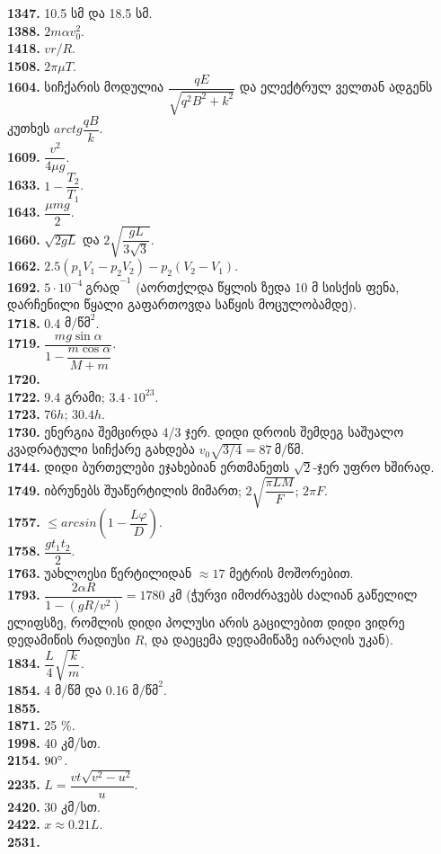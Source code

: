 \documentclass[12pt,a4paper,]{report}
\begin{document}
\textbf{1347.} 10.5 სმ და 18.5 სმ. \\
\textbf{1388.} $2m\alpha v_0^2$. \\
\textbf{1418.} $vr/R$. \\
\textbf{1508.} $2\pi\mu T$. \\
\textbf{1604.} სიჩქარის მოდულია $\dfrac{qE}{\sqrt{q^2B^2 + k^2}}$ და ელექტრულ ველთან ადგენს კუთხეს $arctg\dfrac{qB}{k}$. \\
\textbf{1609.} $\dfrac{v^2}{4\mu g}$. \\
\textbf{1633.} $1-\dfrac{T_2}{T_1}$. \\
\textbf{1643.} $\dfrac{\mu m g}{2}.$\\
\textbf{1660.} $\sqrt{2gL}$ და $2\sqrt{\dfrac{gL}{3\sqrt{3}}}$. \\
\textbf{1662.} $2.5(p_1 V_1 - p_2 V_2) - p_2(V_2 - V_1)$. \\
\textbf{1692.} $5 \cdot 10^{-4}\ \text{გრად}^{-1}$ (აორთქლდა წყლის ზედა 10 მ სისქის ფენა, დარჩენილი წყალი გაფართოვდა საწყის მოცულობამდე).\\
\textbf{1718.} 0.4 $\text{მ}/\text{წმ}^2$. \\
\textbf{1719.} $\dfrac{mg\sin\alpha}{1-\dfrac{m\cos\alpha}{M+m}}$. \\
\textbf{1720.} \\
\textbf{1722.} 9.4 გრამი; $3.4 \cdot 10^{23}$.\\
\textbf{1723.} $76h$; $30.4h$.\\
\textbf{1730.} ენერგია შემცირდა 4/3 ჯერ. დიდი დროის შემდეგ საშუალო კვადრატული სიჩქარე გახდება $v_0 \sqrt{3/4} = 87\ \text{მ/წმ}$. \\
\textbf{1744.} დიდი ბურთელები ეჯახებიან ერთმანეთს $\sqrt{2}$-ჯერ უფრო ხშირად. \\
\textbf{1749.} იბრუნებს შუაწერტილის მიმართ; $2\sqrt{\dfrac{\pi LM}{F}}$; $2\pi F$. \\
\textbf{1757.} $\leq arcsin\left(1-\dfrac{L\varphi}{D} \right)$. \\
\textbf{1758.} $\dfrac{gt_1 t_2}{2}$. \\
\textbf{1763.} უახლოესი წერტილიდან $\approx 17$ მეტრის მოშორებით. \\
\textbf{1793.} $\dfrac{2\alpha R}{1 - (gR/v^2)} = 1780$ კმ (ჭურვი იმოძრავებს ძალიან გაწელილ ელიფსზე, რომლის დიდი პოლუსი არის გაცილებით დიდი ვიდრე დედამიწის რადიუსი $R$, და დაეცემა დედამიწაზე იარაღის უკან). \\
\textbf{1834.} $\dfrac{L}{4}\sqrt{\dfrac{k}{m}}$. \\
\textbf{1854.} 4 მ/წმ და 0.16 $\text{მ}/\text{წმ}^2$. \\
\textbf{1855.} \\
\textbf{1871.} 25 $\%$. \\
\textbf{1998.} 40 კმ/სთ. \\
\textbf{2154.} $90 \degree$. \\
\textbf{2235.} $L=\dfrac{vt\sqrt{v^2-u^2}}{u}$. \\
\textbf{2420.} 30 კმ/სთ. \\
\textbf{2422.} $x\approx0.21L$. \\
\textbf{2531.} 
\end{document}
